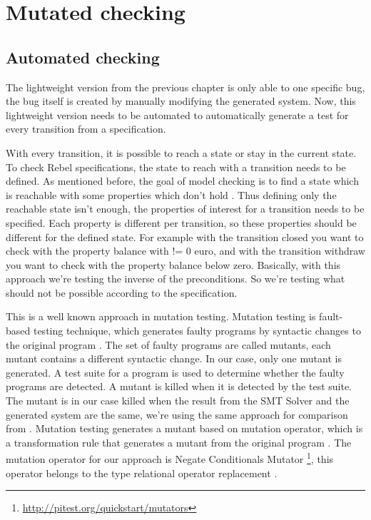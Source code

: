 \chapter{Mutated checking}
\label{sec:ch4}


\section{Automated checking}

The lightweight version from the previous chapter is only able to one specific bug, the bug itself is created by manually modifying the generated system. Now, this lightweight version needs to be automated to automatically generate a test for every transition from a specification.

With every transition, it is possible to reach a state or stay in the current state. To check Rebel specifications, the state to reach with a transition needs to be defined. As mentioned before, the goal of model checking is to find a state which is reachable with some properties which don't hold \cite[p.5]{stoel_storm_vinju_bosman_2016}. Thus defining only the reachable state isn't enough, the properties of interest for a transition needs to be specified. Each property is different per transition, so these properties should be different for the defined state. For example with the transition closed you want to check with the property balance with != 0 euro, and with the transition withdraw you want to check with the property balance below zero. Basically, with this approach we're testing the inverse of the preconditions. So we're testing what should not be possible according to the specification. 

This is a well known approach in mutation testing. Mutation testing is fault-based testing technique, which generates faulty programs by syntactic changes to the original program \cite[p.1]{jia2011analysis}. The set of faulty programs are called mutants, each mutant contains a different syntactic change. In our case, only one mutant is generated. A test suite for a program is used to determine whether the faulty programs are detected. A mutant is killed when it is detected by the test suite. The mutant is in our case killed when the result from the SMT Solver and the generated system are the same, we're using the same approach for comparison from . Mutation testing generates a mutant based on mutation operator, which is a transformation rule that generates a mutant from the original program \cite[p.3-4]{jia2011analysis}. The mutation operator for our approach is Negate Conditionals Mutator \footnote{\url{http://pitest.org/quickstart/mutators}}, this operator belongs to the type relational operator replacement \cite[p.688]{king1991fortran}.

